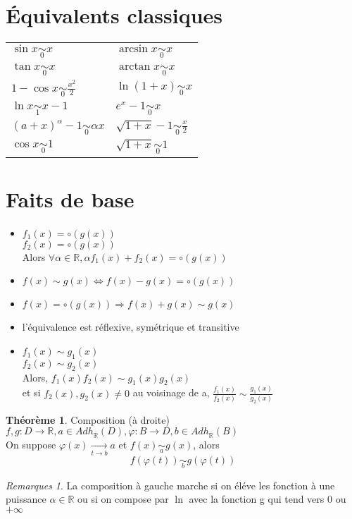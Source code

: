 \documentclass[fleqn]{article}
\theoremstyle{definition} \newtheorem*{defi}{D\'efinition}
\theoremstyle{definition} \newtheorem*{theo}{Th\'eor\`eme}
\theoremstyle{remark} \newtheorem*{rqs}{Remarques}
\begin{document}
\section{\'Equivalents classiques}
\begin{tabular}{@{}ll@{}}
		$\sin x \underset{0}{\sim} x$ & $\arcsin x \underset{0}{\sim} x$ \\
		$\tan x \underset{0}{\sim} x$ & $\arctan x \underset{0}{\sim} x$ \\
		$1 - \cos x \underset{0}{\sim} \frac{x^2}{2}$ & $\ln(1+x) \underset{0}{\sim} x$ \\
		$\ln x \underset{1}{\sim} x-1$ & $e^x -1 \underset{0}{\sim} x$ \\
		$(a+x)^{\alpha} -1 \underset{0}{\sim} \alpha x$ & $\sqrt{1+x} - 1 \underset{0}{\sim} \frac{x}{2}$ \\
		$\cos x \underset{0}{\sim} 1$ & $\sqrt{1+x} \underset{0}{\sim} 1$ \\
\end{tabular}

\section{Faits de base}
\begin{itemize}
	\item $f_1(x) = \circ (g(x))$\\
		$f_2(x)	= \circ (g(x))$ \\
		Alors $\forall \alpha \in \mathbb{R}, \alpha f_1(x) + f_2(x) = \circ (g(x))$
	\item $f(x) \sim g(x) \Leftrightarrow f(x) - g(x) = \circ (g(x))$
	\item $f(x) = \circ(g(x)) \Rightarrow f(x) + g(x) \sim g(x)$
	\item l'\'equivalence est r\'eflexive, sym\'etrique et transitive
	\item $f_1(x) \sim g_1(x)$\\
		$f_2(x) \sim g_2(x)$\\
		Alors, $f_1(x)f_2(x) \sim g_1(x)g_2(x)$ \\et si $f_2(x), g_2(x) \neq 0$ au voisinage de a, $\frac{f_1(x)}{f_2(x)} \sim
		\frac{g_1(x)}{g_2(x)}$
\end{itemize}

\begin{theo} Composition (\`a droite)\\
	$f,g: D \rightarrow \mathbb{R}, a \in Adh_{\overline{\mathbb{R}}}(D), \varphi: B \rightarrow D, b \in Adh_{\overline{\mathbb{R}}}(B)$ \\
	On suppose $\varphi(x)\underset{t\rightarrow b}{\rightarrow} a$ et $f(x)\underset{a}{\sim} g(x)$, alors
	\[f(\varphi(t))\underset{b}{\sim} g(\varphi(t))\]

\end{theo}

\begin{rqs}
	La composition \`a gauche marche si on \'el\'eve les fonction \`a une puissance $\alpha \in \mathbb{R}$ ou si on compose par $\ln$ avec la
	fonction g qui tend vers $0$ ou $+\infty$
\end{rqs}
\end{document}
